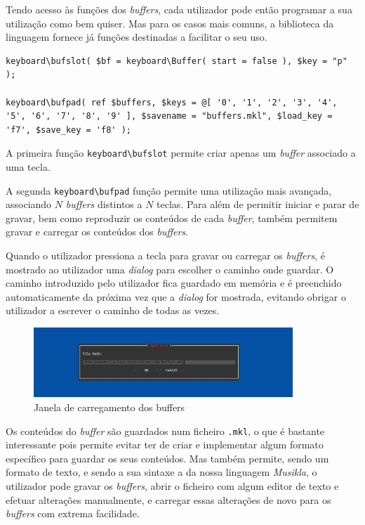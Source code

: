 Tendo acesso às funções dos \textit{buffers}, cada utilizador pode então programar a sua utilização como bem quiser. Mas para os casos mais comuns, a biblioteca da linguagem fornece já funções destinadas a facilitar o seu uso.

\begin{lstlisting}[caption={Funções disponibilizadas para criação de \textit{buffers} controlados por teclados.}]
keyboard\bufslot( $bf = keyboard\Buffer( start = false ), $key = "p" );

keyboard\bufpad( ref $buffers, $keys = @[ '0', '1', '2', '3', '4', '5', '6', '7', '8', '9' ], $savename = "buffers.mkl", $load_key = 'f7', $save_key = 'f8' );
\end{lstlisting}

A primeira função \texttt{keyboard\textbackslash{}bufslot} permite criar apenas um \textit{buffer} associado a uma tecla.

A segunda \texttt{keyboard\textbackslash{}bufpad} função permite uma utilização mais avançada, associando $N$ \textit{buffers} distintos a $N$ teclas. Para além de permitir iniciar e parar de gravar, bem como reproduzir os conteúdos de cada \textit{buffer}, também permitem gravar e carregar os conteúdos dos \textit{buffers}.

Quando o utilizador pressiona a tecla para gravar ou carregar os \textit{buffers}, é mostrado ao utilizador uma \textit{dialog} para escolher o caminho onde guardar. O caminho introduzido pelo utilizador fica guardado em memória e é preenchido automaticamente da próxima vez que a \textit{dialog} for mostrada, evitando obrigar o utilizador a escrever o caminho de todas as vezes.

\begin{figure}[h]
\begin{center}
    \includegraphics[width=0.87\textwidth]{img/open_buffers_dialog.png}
\end{center}
\caption{Janela de carregamento dos buffers}
\end{figure}

Os conteúdos do \textit{buffer} são guardados num ficheiro \texttt{.mkl}, o que é bastante interessante pois permite evitar ter de criar e implementar algum formato específico para guardar os seus conteúdos. Mas também permite, sendo um formato de texto, e sendo a sua sintaxe a da nossa linguagem \textit{Musikla}, o utilizador pode gravar os \textit{buffers}, abrir o ficheiro com algum editor de texto e efetuar alterações manualmente, e carregar essas alterações de novo para os \textit{buffers} com extrema facilidade.

